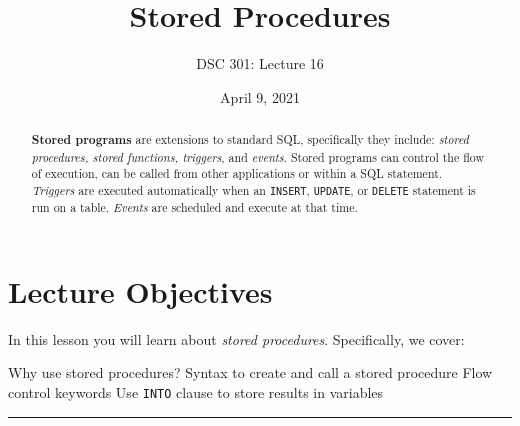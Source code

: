\documentclass{article}
\begin{document}
\title{Stored Procedures}
\author{DSC 301: Lecture 16}
\date{April 9, 2021} %
\maketitle

\begin{abstract}
\noindent  \textbf{Stored programs} are extensions to standard SQL, specifically they include:  \textit{stored procedures, stored functions, triggers}, and \textit{events}. Stored programs can control the flow of execution, can be called from other applications or within a SQL statement.  \textit{Triggers} are executed automatically when an \texttt{INSERT}, \texttt{UPDATE}, or \texttt{DELETE} statement is run on a table.  \textit{Events} are scheduled and execute at that time.  
\end{abstract}




\section*{Lecture Objectives}
\noindent In this lesson you will learn about \textit{stored procedures}.  Specifically, we cover:  %

\begin{outline}
	\1 Why use stored procedures?  %
        \1  Syntax to create and call a stored procedure
     		\2 Flow control keywords
		\2 Use \texttt{INTO} clause to store results in variables
		
	 
\end{outline}

\hspace{-0.5cm}\rule[-0.101in]{\textwidth}{0.0025in}
% 







\end{document}
